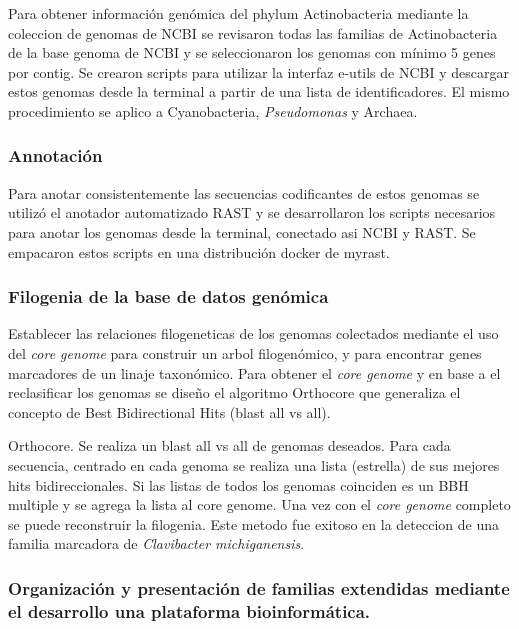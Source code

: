 \documentclass[12pt,twoside]{reedthesis}
\begin{document}
  Para obtener información genómica del phylum Actinobacteria mediante la
  coleccion de genomas de NCBI se revisaron todas las familias de
  Actinobacteria de la base genoma de NCBI y se seleccionaron los genomas
  con mínimo 5 genes por contig. Se crearon scripts para utilizar la
  interfaz e-utils de NCBI y descargar estos genomas desde la terminal a
  partir de una lista de identificadores. El mismo procedimiento se aplico
  a Cyanobacteria, \emph{Pseudomonas} y Archaea.
  
  \subsubsection{Annotación}\label{annotacion}
  
  Para anotar consistentemente las secuencias codificantes de estos
  genomas se utilizó el anotador automatizado RAST y se desarrollaron los
  scripts necesarios para anotar los genomas desde la terminal, conectado
  asi NCBI y RAST. Se empacaron estos scripts en una distribución docker
  de myrast.
  
  \subsubsection{Filogenia de la base de datos
  genómica}\label{filogenia-de-la-base-de-datos-genomica}
  
  Establecer las relaciones filogeneticas de los genomas colectados
  mediante el uso del \emph{core genome} para construir un arbol
  filogenómico, y para encontrar genes marcadores de un linaje taxonómico.
  Para obtener el \emph{core genome} y en base a el reclasificar los
  genomas se diseño el algoritmo Orthocore que generaliza el concepto de
  Best Bidirectional Hits (blast all vs all).
  
  Orthocore. Se realiza un blast all vs all de genomas deseados. Para cada
  secuencia, centrado en cada genoma se realiza una lista (estrella) de
  sus mejores hits bidireccionales. Si las listas de todos los genomas
  coinciden es un BBH multiple y se agrega la lista al core genome. Una
  vez con el \emph{core genome} completo se puede reconstruir la
  filogenia. Este metodo fue exitoso en la deteccion de una familia
  marcadora de \emph{Clavibacter michiganensis}.
  
  \subsubsection{Organización y presentación de familias extendidas
  mediante el desarrollo una plataforma
  bioinformática.}\label{organizacion-y-presentacion-de-familias-extendidas-mediante-el-desarrollo-una-plataforma-bioinformatica.}
  
\end{document}
